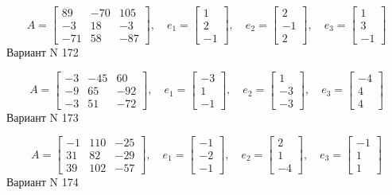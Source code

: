 \documentclass[11pt]{report}
\begin{document}
$$A = \left[\begin{matrix}89 & -70 & 105\\-3 & 18 & -3\\-71 & 58 & -87\end{matrix}\right],\quad e_1 = \left[\begin{matrix}1\\2\\-1\end{matrix}\right],\quad e_2 = \left[\begin{matrix}2\\-1\\2\end{matrix}\right],\quad e_3 = \left[\begin{matrix}1\\3\\-1\end{matrix}\right]$$Вариант N 172

$$A = \left[\begin{matrix}-3 & -45 & 60\\-9 & 65 & -92\\-3 & 51 & -72\end{matrix}\right],\quad e_1 = \left[\begin{matrix}-3\\1\\-1\end{matrix}\right],\quad e_2 = \left[\begin{matrix}1\\-3\\-3\end{matrix}\right],\quad e_3 = \left[\begin{matrix}-4\\4\\4\end{matrix}\right]$$Вариант N 173

$$A = \left[\begin{matrix}-1 & 110 & -25\\31 & 82 & -29\\39 & 102 & -57\end{matrix}\right],\quad e_1 = \left[\begin{matrix}-1\\-2\\-1\end{matrix}\right],\quad e_2 = \left[\begin{matrix}2\\1\\-4\end{matrix}\right],\quad e_3 = \left[\begin{matrix}-1\\1\\1\end{matrix}\right]$$Вариант N 174
\end{document}

